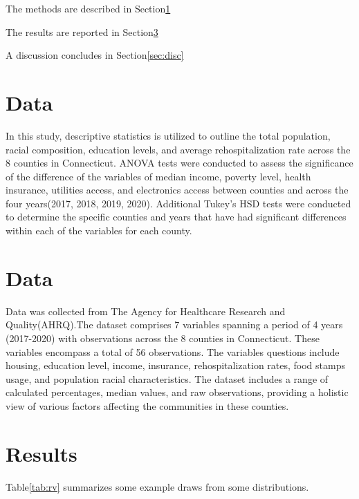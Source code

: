 \documentclass[12pt]{article}
\begin{document}
The methods are described in Section\ref{sec:meth}

The results are reported in Section\ref{sec:resu}

A discussion concludes in Section\ref{sec:disc}

\section{Data}\label{sec:meth}

In this study, descriptive statistics is utilized to outline the total population, racial composition, 
education levels, and average rehospitalization rate across the 8 counties in Connecticut. ANOVA tests were 
conducted to assess the significance of the difference of the variables of median income, poverty level, health insurance, 
utilities access, and electronics access between counties and across the four years(2017, 2018, 2019, 2020). Additional 
Tukey’s HSD tests were conducted to determine the specific counties and years that have had significant differences within 
each of the variables for each county.

\section{Data}\label{sec:data}

Data was collected from The Agency for Healthcare Research and Quality(AHRQ).The dataset comprises 7 variables 
spanning a period of 4 years (2017-2020) with observations across the 8 counties in Connecticut. These variables 
encompass a total of 56 observations. The variables questions include housing, education level, income, insurance,
 rehospitalization rates, food stamps usage, and population racial characteristics. The dataset includes a range of 
 calculated percentages, median values, and raw observations, providing a holistic view of various factors affecting 
 the communities in these counties. 


\section{Results}\label{sec:resu}


Table\ref{tab:rv} summarizes some example draws from some distributions.
\lipsum[1]
\end{document}
